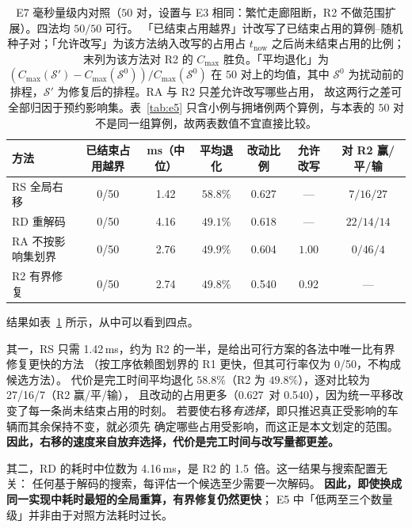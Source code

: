 \documentclass[manuscript,screen,review]{acmart}
\newcommand{\NPairs}{50}
\newcommand{\FeasRone}{0/\NPairs}            %
\newcommand{\ClosureAliveFrac}{92\%}
\newcommand{\MsShift}{1.42}          %
\newcommand{\MsRedecode}{4.16}       %
\newcommand{\MsAllFuture}{2.76}      %
\newcommand{\MsCheapRtwo}{2.74}      %
\newcommand{\RedecodeRatio}{1.5}     %
\newcommand{\ShiftBad}{0/\NPairs}    %
\newcommand{\RedecodeBad}{0/\NPairs}
\newcommand{\WinVsShift}{27/16/7}    %
\newcommand{\ResFracCheapRtwo}{0.540}
\newcommand{\ResFracShift}{0.627}
\newcommand{\ResFracRedecode}{0.618}
\newcommand{\ResFracAllFuture}{0.604}
\newcommand{\ClosureShareMean}{0.92} %
\begin{document}
\begin{table}[t]
\centering
\caption{E7 毫秒量级内对照（\(\NPairs\) 对，设置与 E3 相同：繁忙走廊阻断，R2 不做范围扩展）。四法均 \(\NPairs/\NPairs\) 可行。
「已结束占用越界」计改写了已结束占用的算例--随机种子对；「允许改写」为该方法纳入改写的占用占 \(t_{\mathrm{now}}\)
之后尚未结束占用的比例；末列为该方法对 R2 的 \(C_{\max}\) 胜负。「平均退化」为 \((C_{\max}(\mathcal{S}')-C_{\max}(\mathcal{S}^0))/C_{\max}(\mathcal{S}^0)\) 在 \(\NPairs\) 对上的均值，其中 \(\mathcal{S}^0\) 为扰动前的排程，\(\mathcal{S}'\) 为修复后的排程。RA 与 R2 只差允许改写哪些占用，
故这两行之差可全部归因于预约影响集。表~\ref{tab:e5} 只含小例与拥堵例两个算例，与本表的 \(\NPairs\) 对不是同一组算例，故两表数值不宜直接比较。}
\label{tab:cheap}
\small
\begin{tabular}{@{}lcccccc@{}}
\toprule
方法 & 已结束占用越界 & ms（中位）& 平均退化 & 改动比例 & 允许改写 & 对 R2 赢/平/输 \\
\midrule
RS 全局右移      & \ShiftBad     & \MsShift    & \(58.8\%\) & \ResFracShift    & ---   & \(7/16/27\) \\
RD 重解码        & \RedecodeBad  & \MsRedecode & \(49.1\%\) & \ResFracRedecode & ---   & \(22/14/14\) \\
RA 不按影响集划界 & \ShiftBad     & \MsAllFuture & \(49.9\%\) & \ResFracAllFuture & \(1.00\) & \(0/46/4\) \\
R2 有界修复      & \ShiftBad     & \MsCheapRtwo & \(49.8\%\) & \ResFracCheapRtwo & \ClosureShareMean & --- \\
\bottomrule
\end{tabular}
\end{table}

结果如表~\ref{tab:cheap} 所示，从中可以看到四点。

其一，RS 只需 \MsShift\,ms，约为 R2 的一半，是给出可行方案的各法中唯一比有界修复更快的方法
（按工序依赖图划界的 R1 更快，但其可行率仅为 \FeasRone，不构成候选方法）。
代价是完工时间平均退化 \(58.8\%\)（R2 为 \(49.8\%\)），逐对比较为 \WinVsShift（R2 赢/平/输），
且改动的占用更多（\ResFracShift\ 对 \ResFracCheapRtwo），因为统一平移改变了每一条尚未结束占用的时刻。
若要使右移\emph{有选择}，即只推迟真正受影响的车辆而其余保持不变，就必须先
确定哪些占用受影响，而这正是本文划定的范围。
\textbf{因此，右移的速度来自放弃选择，代价是完工时间与改写量都更差。}

其二，RD 的耗时中位数为 \MsRedecode\,ms，是 R2 的 \RedecodeRatio\ 倍。这一结果与搜索配置无关：
任何基于解码的搜索，每评估一个候选至少需要一次解码。
\textbf{因此，即使换成同一实现中耗时最短的全局重算，有界修复仍然更快}；
E5 中「低两至三个数量级」并非由于对照方法耗时过长。
\end{document}
